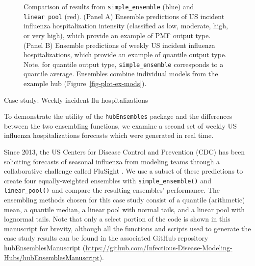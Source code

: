 \documentclass[
  article,
  shortnames,
  notitle]{jss}
\begin{document}
\begin{figure}[H]


\caption{\label{fig-plot-ex-quantile-and-linear-pool}Comparison of
results from \texttt{simple\_ensemble} (blue) and \texttt{linear\ pool}
(red). (Panel A) Ensemble predictions of US incident influenza
hospitalization intensity (classified as low, moderate, high, or very
high), which provide an example of PMF output type. (Panel B) Ensemble
predictions of weekly US incident influenza hospitalizations, which
provide an example of quantile output type. Note, for quantile output
type, \texttt{simple\_ensemble} corresponds to a quantile average.
Ensembles combine individual models from the example hub
(Figure~\ref{fig-plot-ex-mods}).}

\end{figure}%

Case study: Weekly incident flu hospitalizations

To demonstrate the utility of the \texttt{hubEnsembles} package and the
differences between the two ensembling functions, we examine a second
set of weekly US influenza hospitalizations forecasts which were
generated in real time.

Since 2013, the US Centers for Disease Control and Prevention (CDC) has
been soliciting forecasts of seasonal influenza from modeling teams
through a collaborative challenge called FluSight \citep{cdc_flusight}.
We use a subset of these predictions to create four equally-weighted
ensembles with \texttt{simple\_ensemble()} and \texttt{linear\_pool()}
and compare the resulting ensembles' performance. The ensembling methods
chosen for this case study consist of a quantile (arithmetic) mean, a
quantile median, a linear pool with normal tails, and a linear pool with
lognormal tails. Note that only a select portion of the code is shown in
this manuscript for brevity, although all the functions and scripts used
to generate the case study results can be found in the associated GitHub
repository hubEnsemblesManuscript
(\url{https://github.com/Infectious-Disease-Modeling-Hubs/hubEnsemblesManuscript}).
\end{document}
